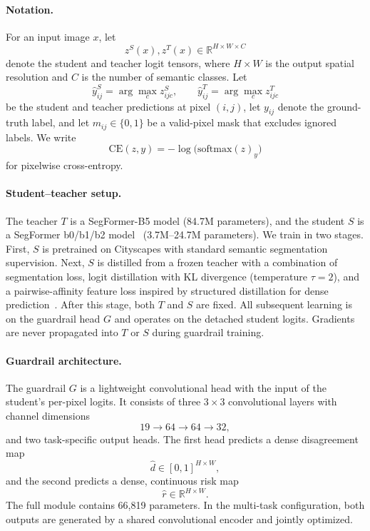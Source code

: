 \documentclass{article}
\begin{document}
\paragraph{Notation.}
For an input image $x$, let
\[
z^S(x), z^T(x) \in \mathbb{R}^{H \times W \times C}
\]
denote the student and teacher logit tensors, where $H \times W$ is the output spatial resolution and $C$ is the number of semantic classes. Let
\[
\hat y^S_{ij} = \arg\max_c z^S_{ijc},
\qquad
\hat y^T_{ij} = \arg\max_c z^T_{ijc}
\]
be the student and teacher predictions at pixel $(i,j)$, let $y_{ij}$ denote the ground-truth label, and let $m_{ij} \in \{0,1\}$ be a valid-pixel mask that excludes ignored labels. We write
\[
\mathrm{CE}(z,y) = -\log \big(\mathrm{softmax}(z)_y\big)
\]
for pixelwise cross-entropy.


\paragraph{Student--teacher setup.}
The teacher $T$ is a SegFormer-B5 model (84.7M parameters), and the student $S$ is a SegFormer b0/b1/b2 model~\cite{xie2021segformer} (3.7M--24.7M parameters). We train in two stages. First, $S$ is pretrained on Cityscapes with standard semantic segmentation supervision. Next, $S$ is distilled from a frozen teacher with a combination of segmentation loss, logit distillation with KL divergence (temperature $\tau=2$), and a pairwise-affinity feature loss inspired by structured distillation for dense prediction~\cite{liu2019structuredkd}. After this stage, both $T$ and $S$ are fixed. All subsequent learning is on the guardrail head $G$ and operates on the detached student logits. Gradients are never propagated into $T$ or $S$ during guardrail training.


\paragraph{Guardrail architecture.}
The guardrail $G$ is a lightweight convolutional head with the input of the student's per-pixel logits. It consists of three $3{\times}3$ convolutional layers with channel dimensions
\[
19 \rightarrow 64 \rightarrow 64 \rightarrow 32,
\]
and two task-specific output heads. The first head predicts a dense disagreement map
\[
\hat d \in [0,1]^{H \times W},
\]
and the second predicts a dense, continuous risk map
\[
\hat r \in \mathbb{R}^{H \times W}.
\]
The full module contains 66,819 parameters. In the multi-task configuration, both outputs are generated by a shared convolutional encoder and jointly optimized.
\end{document}
